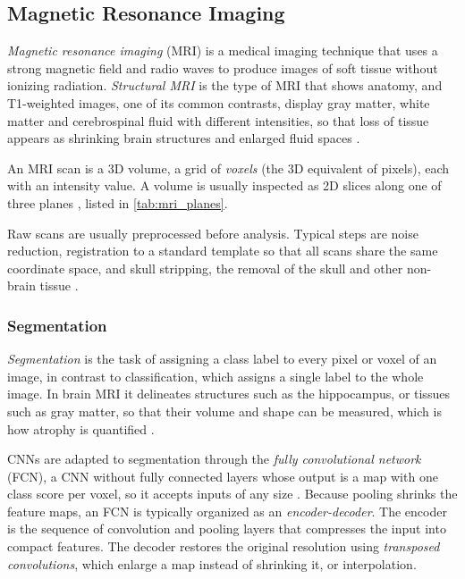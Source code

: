 \subsection{Magnetic Resonance Imaging}
\label{subsec:mri}

\emph{Magnetic resonance imaging} (MRI) is a medical imaging technique that uses a strong magnetic field and radio waves to produce images of soft tissue without ionizing radiation. \emph{Structural MRI} is the type of MRI that shows anatomy, and T1-weighted images, one of its common contrasts, display gray matter, white matter and cerebrospinal fluid with different intensities, so that loss of tissue appears as shrinking brain structures and enlarged fluid spaces \parencite{frisoni2010clinical,nibila2026artificial}.

An MRI scan is a 3D volume, a grid of \emph{voxels} (the 3D equivalent of pixels), each with an intensity value. A volume is usually inspected as 2D slices along one of three planes \parencite{nibila2026artificial}, listed in \cref{tab:mri_planes}.



Raw scans are usually preprocessed before analysis. Typical steps are noise reduction, registration to a standard template so that all scans share the same coordinate space, and skull stripping, the removal of the skull and other non-brain tissue \parencite{nibila2026artificial}.

\subsubsection{Segmentation}
\label{subsubsec:segmentation}

\emph{Segmentation} is the task of assigning a class label to every pixel or voxel of an image, in contrast to classification, which assigns a single label to the whole image. In brain MRI it delineates structures such as the hippocampus, or tissues such as gray matter, so that their volume and shape can be measured, which is how atrophy is quantified \parencite{frisoni2010clinical}.

CNNs are adapted to segmentation through the \emph{fully convolutional network} (FCN), a CNN without fully connected layers whose output is a map with one class score per voxel, so it accepts inputs of any size \parencite{prince2023understanding}. Because pooling shrinks the feature maps, an FCN is typically organized as an \emph{encoder-decoder}. The encoder is the sequence of convolution and pooling layers that compresses the input into compact features. The decoder restores the original resolution using \emph{transposed convolutions}, which enlarge a map instead of shrinking it, or interpolation.

